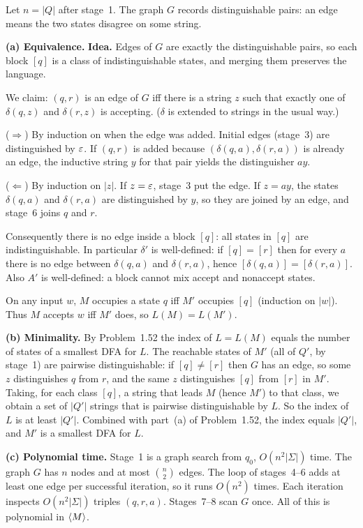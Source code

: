 \begin{soln}
Let $n=\lvert Q\rvert$ after stage~1. The graph $G$ records distinguishable pairs: an edge means the two states disagree on some string.

\textbf{(a) Equivalence.}
\textbf{Idea.} Edges of $G$ are exactly the distinguishable pairs, so each block $[q]$ is a class of indistinguishable states, and merging them preserves the language.

We claim: $(q,r)$ is an edge of $G$ iff there is a string $z$ such that exactly one of $\delta(q,z)$ and $\delta(r,z)$ is accepting. ($\delta$ is extended to strings in the usual way.)

($\Rightarrow$) By induction on when the edge was added. Initial edges (stage~3) are distinguished by $\varepsilon$. If $(q,r)$ is added because $(\delta(q,a),\delta(r,a))$ is already an edge, the inductive string $y$ for that pair yields the distinguisher $ay$.

($\Leftarrow$) By induction on $\lvert z\rvert$. If $z=\varepsilon$, stage~3 put the edge. If $z=ay$, the states $\delta(q,a)$ and $\delta(r,a)$ are distinguished by $y$, so they are joined by an edge, and stage~6 joins $q$ and $r$.

Consequently there is no edge inside a block $[q]$: all states in $[q]$ are indistinguishable. In particular $\delta'$ is well-defined: if $[q]=[r]$ then for every $a$ there is no edge between $\delta(q,a)$ and $\delta(r,a)$, hence $[\delta(q,a)]=[\delta(r,a)]$. Also $A'$ is well-defined: a block cannot mix accept and nonaccept states.

On any input $w$, $M$ occupies a state $q$ iff $M'$ occupies $[q]$ (induction on $\lvert w\rvert$). Thus $M$ accepts $w$ iff $M'$ does, so $L(M)=L(M')$.

\textbf{(b) Minimality.}
By Problem~1.52 the index of $L=L(M)$ equals the number of states of a smallest DFA for $L$. The reachable states of $M'$ (all of $Q'$, by stage~1) are pairwise distinguishable: if $[q]\ne[r]$ then $G$ has an edge, so some $z$ distinguishes $q$ from $r$, and the same $z$ distinguishes $[q]$ from $[r]$ in $M'$. Taking, for each class $[q]$, a string that leads $M$ (hence $M'$) to that class, we obtain a set of $\lvert Q'\rvert$ strings that is pairwise distinguishable by $L$. So the index of $L$ is at least $\lvert Q'\rvert$. Combined with part~(a) of Problem~1.52, the index equals $\lvert Q'\rvert$, and $M'$ is a smallest DFA for $L$.

\textbf{(c) Polynomial time.}
Stage~1 is a graph search from $q_0$, $O(n^2\lvert\Sigma\rvert)$ time. The graph $G$ has $n$ nodes and at most $\binom{n}{2}$ edges. The loop of stages~4--6 adds at least one edge per successful iteration, so it runs $O(n^2)$ times. Each iteration inspects $O(n^2\lvert\Sigma\rvert)$ triples $(q,r,a)$. Stages~7--8 scan $G$ once. All of this is polynomial in $\langle M\rangle$.
\end{soln}

